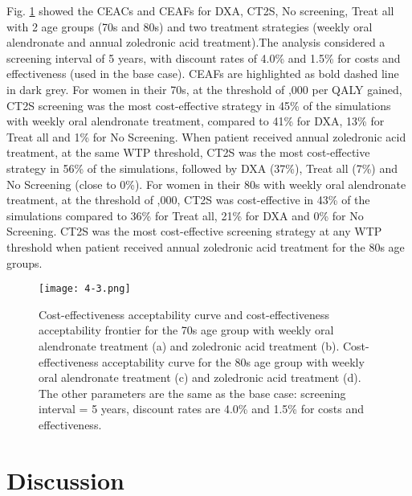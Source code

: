 Fig. \ref{fig:4-3} showed the CEACs and CEAFs for DXA, CT2S, No screening, Treat all with  2 age groups (70s and 80s) and two treatment strategies (weekly oral alendronate and annual zoledronic acid treatment).The analysis considered a screening interval of 5 years, with discount rates of 4.0\% and 1.5\% for costs and effectiveness (used in the base case). CEAFs are highlighted as bold dashed line in dark grey. For women in their 70s, at the threshold of ,000 per QALY gained, CT2S screening was the most cost-effective strategy in 45\% of the simulations with weekly oral alendronate treatment, compared to 41\% for DXA, 13\% for Treat all  and 1\% for No Screening. When patient received annual zoledronic acid treatment, at the same WTP threshold, CT2S was the most cost-effective strategy in 56\% of the simulations, followed by DXA (37\%), Treat all (7\%) and No Screening (close to 0\%). For women in their 80s with weekly oral alendronate treatment, at the threshold of ,000, CT2S was cost-effective in 43\% of the simulations compared to 36\% for Treat all, 21\% for DXA and 0\% for No Screening. CT2S was the most cost-effective screening strategy at any WTP threshold when patient received annual zoledronic acid treatment for the 80s age groups.

\begin{figure}[!h]
\centering
\texttt{[image: 4-3.png]}
\caption{Cost-effectiveness acceptability curve and cost-effectiveness acceptability frontier for the 70s age group with weekly oral alendronate treatment (a) and zoledronic acid treatment (b). Cost-effectiveness acceptability curve for the 80s age group with weekly oral alendronate treatment (c) and zoledronic acid treatment (d). The other parameters are the same as the base case: screening interval = 5 years, discount rates are 4.0\% and 1.5\% for costs and effectiveness.}
\label{fig:4-3}
\end{figure}

\section{Discussion}

